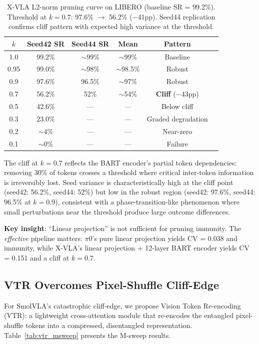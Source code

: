 \documentclass[letterpaper]{article}
\begin{document}
\begin{table}[t]
\centering
\caption{X-VLA L2-norm pruning curve on LIBERO (baseline SR = 99.2\%). Threshold at $k{=}0.7$: 97.6\% $\to$ 56.2\% ($-$41pp). Seed44 replication confirms cliff pattern with expected high variance at the threshold.}
\label{tab:xvla_curve}
\small
\begin{tabular}{@{}cccccc@{}}
\toprule
$k$ & \textbf{Seed42 SR} & \textbf{Seed44 SR} & \textbf{Mean} & \textbf{Pattern} \\
\midrule
1.0  & 99.2\% & $\sim$99\%  & $\sim$99\%  & Baseline \\
0.95 & 99.0\% & $\sim$98\%  & $\sim$98.5\% & Robust \\
0.9  & 97.6\% & 96.5\%     & $\sim$97\%  & Robust \\
0.7  & 56.2\% & 52\%       & $\sim$54\%  & \textbf{Cliff} ($-$43pp) \\
0.5  & 42.6\% & ---        & ---         & Below cliff \\
0.3  & 23.0\% & ---        & ---         & Graded degradation \\
0.2  & $\sim$4\% & ---     & ---         & Near-zero \\
0.1  & $\sim$0\% & ---     & ---         & Failure \\
\bottomrule
\end{tabular}
\end{table}

The cliff at $k{=}0.7$ reflects the BART encoder's partial token dependencies: removing 30\% of tokens crosses a threshold where critical inter-token information is irreversibly lost. Seed variance is characteristically high at the cliff point (seed42: 56.2\%, seed44: 52\%) but low in the robust region (seed42: 97.6\%, seed44: 96.5\% at $k{=}0.9$), consistent with a phase-transition-like phenomenon where small perturbations near the threshold produce large outcome differences.

\textbf{Key insight}: ``Linear projection'' is not sufficient for pruning immunity. The \emph{effective} pipeline matters: $\pi$0's pure linear projection yields CV = 0.038 and immunity, while X-VLA's linear projection + 12-layer BART encoder yields CV = 0.151 and a cliff at $k{=}0.7$.

\subsection{VTR Overcomes Pixel-Shuffle Cliff-Edge}
\label{sec:vtr}

For SmolVLA's catastrophic cliff-edge, we propose Vision Token Re-encoding (VTR): a lightweight cross-attention module that re-encodes the entangled pixel-shuffle tokens into a compressed, disentangled representation. Table~\ref{tab:vtr_msweep} presents the M-sweep results.
\end{document}
